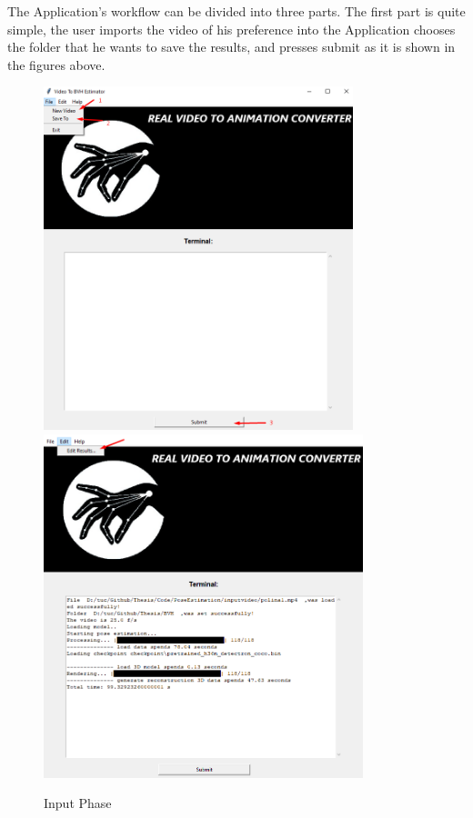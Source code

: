 The Application's workflow can be divided into three parts. The first part is quite simple, the user imports the video of his preference into the Application chooses the folder that he wants to save the results, and presses submit as it is shown in the figures above. 

\begin{figure}[htp]
	\centering
	{\includegraphics[height=10cm,width=0.48\linewidth]{figures/Requirements/Workflow1_1.png}}
	\hspace{1em}%
	{\includegraphics[height=10cm, width=0.48\linewidth]{figures/Requirements/Workflow1_2.png}}
	\captionsetup{labelformat=empty}
	\caption{Input Phase}
\end{figure}

